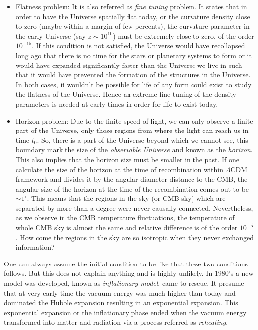 \begin{itemize}
	\item Flatness problem: It is also referred as {\it fine tuning} problem. It 
				states that in order to have the Universe spatially flat today, or
				the curvature density close  to zero (maybe within a margin of
				few percents), the curvature parameter in the early Universe (say 
				$z\sim10^{10}$) must be extremely close to zero, of the order $10^{-15}$.
				If this condition is not satisfied, the Universe would have recollapsed
				long ago that there is no time for the stars or planetary systems to form
				or it would have expanded significantly faster than the Universe
				we live in such that it would have prevented the formation of the structures
				in the Universe. In both cases, it wouldn't be possible for life
				of any form could exist to study the flatness of the Universe. Hence
				an extreme fine tuning of the density parameters is needed at early
				times in order for life to exist today.

	\item Horizon problem: Due to the finite speed of light, we can only observe
				a finite part of the Universe, 
				only those regions from where the light can reach us
				in time $t_0$. So, there is a part of the Universe beyond which
				we cannot see, this boundary mark the size of the {\it observable Universe}
				and known as the {\it horizon}. This also implies that the horizon
				size must be smaller in the past. If one calculate the size of the
				horizon at the time of recombination within $\Lambda$CDM framework and
				divides it by the angular diameter distance to the CMB, the angular
				size of the horizon at the time of the recombination 
				comes out to be $\sim 1^{\circ}$. This means
				that the regions in the sky (or CMB sky) which are separated by 
				more than a degree were never causally connected. Nevertheless, as
				we observe in the CMB temperature fluctuations, the temperature of
				whole CMB sky is almost the same and relative difference is of the 
				order $10^{-5}$. How come the regions in the sky are so isotropic
				when they never exchanged information?
\end{itemize}

One can always assume the initial condition to be like that these two conditions
follows. But this does not explain anything and is highly unlikely. In 1980's 
a new model was developed, known as {\it inflationary model}, came to rescue. It presume
that at very early time the vacuum energy was much higher than today and dominated
the Hubble expansion resulting in an exponential expansion. This exponential
expansion or the inflationary phase ended when the vacuum energy transformed into
matter and radiation via a process referred as {\it reheating}.

